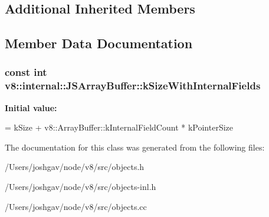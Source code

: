 \subsection*{Additional Inherited Members}


\subsection{Member Data Documentation}
\subsubsection[{\texorpdfstring{k\+Size\+With\+Internal\+Fields}{kSizeWithInternalFields}}]{\setlength{\rightskip}{0pt plus 5cm}const int v8\+::internal\+::\+J\+S\+Array\+Buffer\+::k\+Size\+With\+Internal\+Fields\hspace{0.3cm}{\ttfamily [static]}}\hypertarget{classv8_1_1internal_1_1_j_s_array_buffer_ac674e35a2344b89961113e8d60edf0a9}{}\label{classv8_1_1internal_1_1_j_s_array_buffer_ac674e35a2344b89961113e8d60edf0a9}
{\bfseries Initial value\+:}
\begin{DoxyCode}
=
      kSize + v8::ArrayBuffer::kInternalFieldCount * kPointerSize
\end{DoxyCode}


The documentation for this class was generated from the following files\+:\begin{DoxyCompactItemize}
\item 
/\+Users/joshgav/node/v8/src/objects.\+h\item 
/\+Users/joshgav/node/v8/src/objects-\/inl.\+h\item 
/\+Users/joshgav/node/v8/src/objects.\+cc\end{DoxyCompactItemize}
